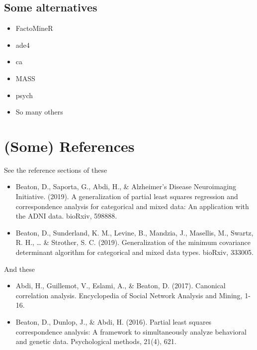 \documentclass[
  ignorenonframetext,
]{beamer}
\providecommand{\tightlist}{%
  \setlength{\itemsep}{0pt}\setlength{\parskip}{0pt}}
\begin{document}
\hypertarget{some-alternatives}{%
\subsection{Some alternatives}\label{some-alternatives}}

\begin{itemize}[<+->]
\tightlist
\item
  FactoMineR
\item
  ade4
\item
  ca
\item
  MASS
\item
  psych
\item
  So many others
\end{itemize}

\hypertarget{some-references}{%
\section{(Some) References}\label{some-references}}

\begin{frame}{See the reference sections of these}
\protect\hypertarget{see-the-reference-sections-of-these}{}

\begin{itemize}[<+->]
\item
  Beaton, D., Saporta, G., Abdi, H., \& Alzheimer's Disease Neuroimaging
  Initiative. (2019). A generalization of partial least squares
  regression and correspondence analysis for categorical and mixed data:
  An application with the ADNI data. bioRxiv, 598888.
\item
  Beaton, D., Sunderland, K. M., Levine, B., Mandzia, J., Masellis, M.,
  Swartz, R. H., \ldots{} \& Strother, S. C. (2019). Generalization of
  the minimum covariance determinant algorithm for categorical and mixed
  data types. bioRxiv, 333005.
\end{itemize}

\end{frame}

\begin{frame}{And these}
\protect\hypertarget{and-these}{}

\begin{itemize}[<+->]
\item
  Abdi, H., Guillemot, V., Eslami, A., \& Beaton, D. (2017). Canonical
  correlation analysis. Encyclopedia of Social Network Analysis and
  Mining, 1-16.
\item
  Beaton, D., Dunlop, J., \& Abdi, H. (2016). Partial least squares
  correspondence analysis: A framework to simultaneously analyze
  behavioral and genetic data. Psychological methods, 21(4), 621.
\end{itemize}

\end{frame}
\end{document}

